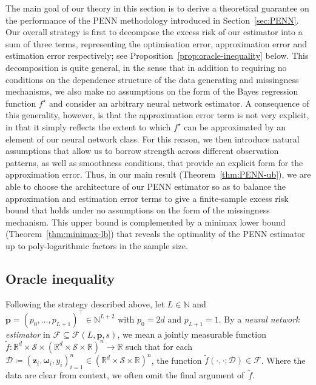 \documentclass[12pt]{article}
\def\tilde{\widetilde}
\begin{document}
The main goal of our theory in this section is to derive a theoretical guarantee on the performance of the PENN methodology introduced in Section~\ref{sec:PENN}.  Our overall strategy is first to decompose the excess risk of our estimator into a sum of three terms, representing the optimisation error, approximation error and estimation error respectively; see Proposition~\ref{prop:oracle-inequality} below.  This decomposition is quite general, in the sense that in addition to requiring no conditions on the dependence structure of the data generating and missingness mechanisms, we also make no assumptions on the form of the Bayes regression function $f^\star$ and consider an arbitrary neural network estimator.  A consequence of this generality, however, is that the approximation error term is not very explicit, in that it simply reflects the extent to which $f^\star$ can be approximated by an element of our neural network class.  For this reason, we then introduce natural assumptions that allow us to borrow strength across different observation patterns, as well as smoothness conditions, that provide an explicit form for the approximation error.  Thus, in our main result (Theorem~\ref{thm:PENN-ub}), we are able to choose the architecture of our PENN estimator so as to balance the approximation and estimation error terms to give a finite-sample excess risk bound that holds under no assumptions on the form of the missingness mechanism.  This upper bound is complemented by a minimax lower bound (Theorem~\ref{thm:minimax-lb}) that reveals the optimality of the PENN estimator up to poly-logarithmic factors in the sample size.

\subsection{Oracle inequality} \label{sec:oracle-inequality}

Following the strategy described above, let $L\in\mathbb{N}$ and $\bm{p}=(p_0,\ldots,p_{L+1})^\top \in \mathbb{N}^{L+2}$ with $p_0=2d$ and $p_{L+1}=1$.
By a \emph{neural network estimator} in $\mathcal{F} \subseteq \mathcal{F}(L,\bm p,s)$, we mean a jointly measurable function $\tilde{f}:\mathbb{R}^d \times \mathcal{S} \times (\mathbb{R}^d \times \mathcal{S} \times \mathbb{R})^n  \rightarrow \mathbb{R}$ such that for each $\mathcal{D} \coloneqq (\bm z_i,\bm \omega_i,y_i)_{i=1}^n \in (\mathbb{R}^d \times \mathcal{S} \times \mathbb{R})^n$, the function $\tilde{f}(\cdot,\cdot;\mathcal{D}) \in \mathcal{F}$.  Where the data are clear from context, we often omit the final argument of~$\tilde{f}$. 
\end{document}
